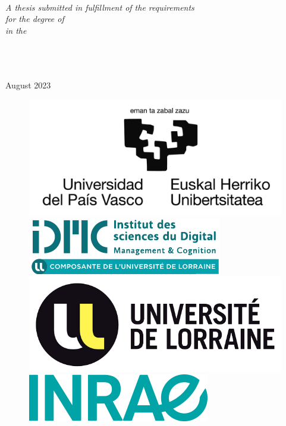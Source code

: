 \documentclass[
11pt, %
english, %
singlespacing, %
headsepline, %
]{Control/UL_control/UL_utils/MasterDoctoralThesis} %
\begin{document}
\begin{titlepage}
\begin{center}
\begin{minipage}[t]{0.4\textwidth}
\begin{flushright}
\end{flushright}
\end{minipage}\\[2cm]
 
\vfill

\large \textit{A thesis submitted in fulfillment of the requirements\\ for the degree of \degreename}\\[0.3cm] %
\textit{in the}\\[0.4cm]
\groupname\\\deptname\\\facname\\[1cm] %
 
\vfill

{\large 
August 2023
}\\[1cm] %

\begin{figure}[htp]
\centering
\includegraphics[width=.20\textwidth]{Figures/00_Logos/logo_upv.jpg}\hfill
\includegraphics[width=.20\textwidth]{Figures/00_Logos/logo_idmc.png}\hfill
\includegraphics[width=.20\textwidth]{Figures/00_Logos/logo_lorraine.png}\hfill
\includegraphics[width=.20\textwidth]{Figures/00_Logos/logo_inrae.png}
\end{figure}
 
\vfill
\end{center}
\end{titlepage}

\end{document}
